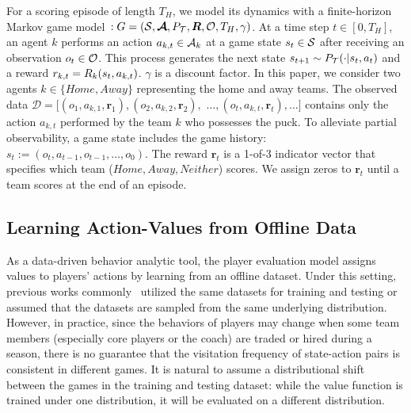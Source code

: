 \documentclass{article}
\newcommand{\horizon}{T_{H}}
\newcommand{\state}{s}
\newcommand{\observation}{o}
\newcommand{\action}{a}
\newcommand{\transition}{t}
\newcommand{\reward}{r}
\newcommand{\agentIndex}{k}
\newcommand{\gameIndex}{j}
\newcommand{\dataset}{\mathcal{D}}
\begin{document}
For a scoring episode of length $\horizon$, we model its dynamics with a finite-horizon Markov game model~\cite{Littman1994MarkovGame}$: G=(\mathcal{\MakeUppercase{\state}}, \boldsymbol{\mathcal{\MakeUppercase{\action}}}, P_{\mathcal{\MakeUppercase{\transition}}}, \boldsymbol{\MakeUppercase{\reward}}, \mathcal{\MakeUppercase{\observation}},\horizon,\gamma)$. 
At a time step $t\in[0,\horizon]$, an agent $\agentIndex$ performs an action $\action_{\agentIndex,t} \in \mathcal{\MakeUppercase{\action}}_{\agentIndex}$ at a game state $\state_{t} \in \mathcal{\MakeUppercase{\state}}$ after receiving an observation $\observation_{t} \in \mathcal{\MakeUppercase{\observation}}$. 
This process generates the next state $\state_{t+1} \sim P_{\mathcal{\MakeUppercase{\transition}}}(\cdot|\state_t, \action_t)$ and a reward
$\reward_{k,t}=\MakeUppercase{\reward}_{\agentIndex}(\state_{t},\action_{\agentIndex,t})$. $\gamma$ is a discount factor.
In this paper, we consider two agents $\agentIndex\in\{Home, Away\}$ representing the home and away teams. The observed data $\dataset=[(\observation_1,\action_{\agentIndex,1},\boldsymbol{\reward}_{1}),(\observation_2,\action_{\agentIndex,2},\boldsymbol{\reward}_{2}),$ $\ldots,(\observation_t,\action_{\agentIndex,t},\boldsymbol{\reward}_{t}),\ldots]$ contains only the action $\action_{\agentIndex,t}$ performed by the team $\agentIndex$ who possesses the puck.  To alleviate partial observability, a game state includes the game history: $\state_{t} := (\observation_t,\action_{t-1},\observation_{t-1},\ldots,\observation_{0})$. The reward $\boldsymbol{\reward}_{t}$ is a 1-of-3 indicator vector that specifies which team ($Home, Away, Neither$) scores. We assign zeros to $\boldsymbol{\reward}_{t}$ until a team scores at the end of an episode.


\subsection{Learning Action-Values from Offline Data}
\label{subsec:offline-problem}

As a data-driven behavior analytic tool, the player evaluation model assigns values to players' actions by learning from an offline dataset. Under this setting, previous works commonly~\cite{Routley2015Markov,Liu2018DRL,Liu2020soccer,Decroos2019Actions} utilized the same datasets for training and testing or assumed that the datasets are sampled from the same underlying distribution. However, in practice, since the behaviors of players may change when some team members (especially core players or the coach) are traded or hired during a season, there is no guarantee that the visitation frequency of state-action pairs is consistent in different games. It is natural to assume a distributional shift between the games in the training and testing dataset: while the value function is trained under one distribution, it will be evaluated on a different distribution.
\end{document}
